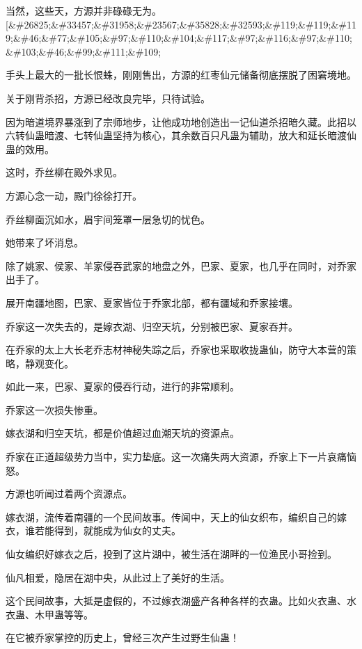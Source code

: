 
\begin{this_body}

当然，这些天，方源并非碌碌无为。[\&\#26825;\&\#33457;\&\#31958;\&\#23567;\&\#35828;\&\#32593;\&\#119;\&\#119;\&\#119;\&\#46;\&\#77;\&\#105;\&\#97;\&\#110;\&\#104;\&\#117;\&\#97;\&\#116;\&\#97;\&\#110;\&\#103;\&\#46;\&\#99;\&\#111;\&\#109;

手头上最大的一批长恨蛛，刚刚售出，方源的红枣仙元储备彻底摆脱了困窘境地。

关于刚背杀招，方源已经改良完毕，只待试验。

因为暗道境界暴涨到了宗师地步，让他成功地创造出一记仙道杀招暗久藏。此招以六转仙蛊暗渡、七转仙蛊坚持为核心，其余数百只凡蛊为辅助，放大和延长暗渡仙蛊的效用。

这时，乔丝柳在殿外求见。

方源心念一动，殿门徐徐打开。

乔丝柳面沉如水，眉宇间笼罩一层急切的忧色。

她带来了坏消息。

除了姚家、侯家、羊家侵吞武家的地盘之外，巴家、夏家，也几乎在同时，对乔家出手了。

展开南疆地图，巴家、夏家皆位于乔家北部，都有疆域和乔家接壤。

乔家这一次失去的，是嫁衣湖、归空天坑，分别被巴家、夏家吞并。

在乔家的太上大长老乔志材神秘失踪之后，乔家也采取收拢蛊仙，防守大本营的策略，静观变化。

如此一来，巴家、夏家的侵吞行动，进行的非常顺利。

乔家这一次损失惨重。

嫁衣湖和归空天坑，都是价值超过血潮天坑的资源点。

乔家在正道超级势力当中，实力垫底。这一次痛失两大资源，乔家上下一片哀痛恼怒。

方源也听闻过着两个资源点。

嫁衣湖，流传着南疆的一个民间故事。传闻中，天上的仙女织布，编织自己的嫁衣，谁若能得到，就能成为仙女的丈夫。

仙女编织好嫁衣之后，投到了这片湖中，被生活在湖畔的一位渔民小哥捡到。

仙凡相爱，隐居在湖中央，从此过上了美好的生活。

这个民间故事，大抵是虚假的，不过嫁衣湖盛产各种各样的衣蛊。比如火衣蛊、水衣蛊、木甲蛊等等。

在它被乔家掌控的历史上，曾经三次产生过野生仙蛊！


\end{this_body}
